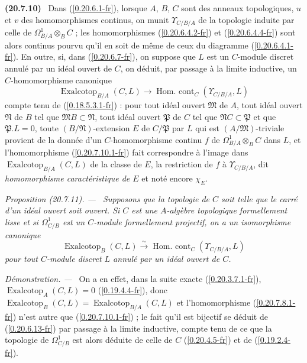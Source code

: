 \documentclass[10pt,oneside]{book}
\makeatletter
\newcommand{\sref}[1]{(\ref{#1})}
\newcommand{\setmanualcurrentlabel}[1]{\def\@currentlabel{#1}}
\newenvironment{env}[1][]{\setmanualcurrentlabel{#1}\par\medskip\noindent\textbf{(#1)}\ }{\par}
\newenvironment{proposition}[1][]{%
  \setmanualcurrentlabel{#1}\par\medskip\noindent\itshape Proposition (#1). ---\ }{\par}
\newenvironment{proof}{%
  \par\medskip\noindent\textit{Démonstration. ---\ }}{\par}
\makeatother
\begin{document}
\begin{env}[20.7.10]
\label{0.20.7.10-fr}
Dans \sref{0.20.6.1-fr}, lorsque $A$, $B$, $C$ sont des anneaux topologiques,
$u$ et $v$ des homomorphismes continus, on munit $\Upsilon_{C/B/A}$ de la
topologie induite par celle de $\Omega^1_{B/A}\otimes_B C$ ; les
homomorphismes \sref{0.20.6.4.2-fr} et \sref{0.20.6.4.4-fr} sont alors
continus pourvu qu'il en soit de même de ceux du diagramme
\sref{0.20.6.4.1-fr}. En outre, si, dans \sref{0.20.6.7-fr}, on suppose que
$L$ est un $C$-module discret annulé par un idéal ouvert de $C$, on déduit,
par passage à la limite inductive, un $C$-homomorphisme canonique
\begin{equation}
\tag{20.7.10.1}
\label{0.20.7.10.1-fr}
  \operatorname{Exalcotop}_{B/A}(C,L)\to
  \operatorname{Hom.\ cont}_C(\Upsilon_{C/B/A},L)
\end{equation}
compte tenu de \sref{0.18.5.3.1-fr} : pour tout idéal ouvert
$\mathfrak{M}$ de $A$, tout idéal ouvert $\mathfrak{N}$ de $B$ tel que
$\mathfrak{M}B\subset\mathfrak{N}$, tout idéal ouvert $\mathfrak{P}$ de $C$
tel que $\mathfrak{N}C\subset\mathfrak{P}$ et que $\mathfrak{P}.L=0$, toute
$(B/\mathfrak{N})$-extension $E$ de $C/\mathfrak{P}$ par $L$ qui est
$(A/\mathfrak{M})$-triviale provient de la donnée d'un $C$-homomorphisme
continu $f$ de $\Omega^1_{B/A}\otimes_B C$ dans $L$, et l'homomorphisme
\sref{0.20.7.10.1-fr} fait correspondre à l'image dans
$\operatorname{Exalcotop}_{B/A}(C,L)$ de la classe de $E$, la restriction de
$f$ à $\Upsilon_{C/B/A}$, dit \emph{homomorphisme caractéristique de $E$} et
noté encore $\chi_E$.
\end{env}

\begin{proposition}[20.7.11]
\label{0.20.7.11-fr}
Supposons que la topologie de $C$ soit telle que le carré d'un idéal ouvert
soit ouvert. Si $C$ est une $A$-algèbre topologique formellement lisse et si
$\Omega^1_{C/B}$ est un $C$-module formellement projectif, on a un
isomorphisme canonique
\begin{equation}
\tag{20.7.11.1}
\label{0.20.7.11.1-fr}
  \operatorname{Exalcotop}_B(C,L)\xrightarrow{\sim}
  \operatorname{Hom.\ cont}_C(\Upsilon_{C/B/A},L)
\end{equation}
pour tout $C$-module discret $L$ annulé par un idéal ouvert de $C$.
\end{proposition}

\begin{proof}
On a en effet, dans la suite exacte \sref{0.20.3.7.1-fr},
$\operatorname{Exalcotop}_A(C,L)=0$ \sref{0.19.4.4-fr}, donc
$\operatorname{Exalcotop}_B(C,L)=\operatorname{Exalcotop}_{B/A}(C,L)$ et
l'homomorphisme \sref{0.20.7.8.1-fr} n'est autre que
\sref{0.20.7.10.1-fr} ; le fait qu'il est bijectif se déduit de
\sref{0.20.6.13-fr} par passage à la limite inductive, compte tenu de ce que
la topologie de $\Omega^1_{C/B}$ est alors déduite de celle de $C$
\sref{0.20.4.5-fr} et de \sref{0.19.2.4-fr}.
\end{proof}
\end{document}
